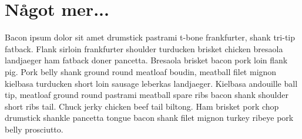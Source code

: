 \documentclass[a4paper]{article}
\begin{document}
\section{Något mer...}
Bacon ipsum dolor sit amet drumstick pastrami t-bone frankfurter, shank tri-tip fatback. Flank sirloin frankfurter shoulder turducken brisket chicken bresaola landjaeger ham fatback doner pancetta. Bresaola brisket bacon pork loin flank pig. Pork belly shank ground round meatloaf boudin, meatball filet mignon kielbasa turducken short loin sausage leberkas landjaeger. Kielbasa andouille ball tip, meatloaf ground round pastrami meatball spare ribs bacon shank shoulder short ribs tail. Chuck jerky chicken beef tail biltong. Ham brisket pork chop drumstick shankle pancetta tongue bacon shank filet mignon turkey ribeye pork belly prosciutto.
\end{document}
